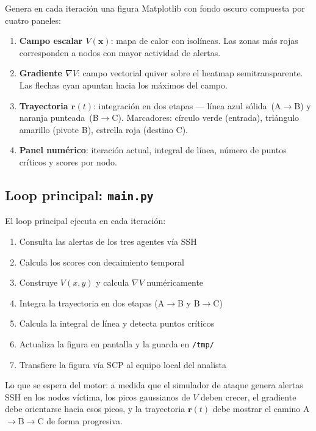 \documentclass[12pt,a4paper]{article}
\newcommand{\grad}{\nabla}
\begin{document}
Genera en cada iteración una figura Matplotlib con fondo oscuro
compuesta por cuatro paneles:

\begin{enumerate}
  \item \textbf{Campo escalar $V(\mathbf{x})$}: mapa de calor con
    isolíneas. Las zonas más rojas corresponden a nodos con mayor
    actividad de alertas.
  \item \textbf{Gradiente $\grad V$}: campo vectorial quiver sobre
    el heatmap semitransparente. Las flechas cyan apuntan hacia los
    máximos del campo.
  \item \textbf{Trayectoria $\mathbf{r}(t)$}: integración en dos
    etapas — línea azul sólida~(A$\to$B) y naranja punteada~(B$\to$C).
    Marcadores: círculo verde (entrada), triángulo amarillo (pivote B),
    estrella roja (destino C).
  \item \textbf{Panel numérico}: iteración actual, integral de línea,
    número de puntos críticos y scores por nodo.
\end{enumerate}

\subsection{Loop principal: \texttt{main.py}}

El loop principal ejecuta en cada iteración:

\begin{enumerate}
  \item Consulta las alertas de los tres agentes vía SSH
  \item Calcula los scores con decaimiento temporal
  \item Construye $V(x,y)$ y calcula $\grad V$ numéricamente
  \item Integra la trayectoria en dos etapas (A$\to$B y B$\to$C)
  \item Calcula la integral de línea y detecta puntos críticos
  \item Actualiza la figura en pantalla y la guarda en \texttt{/tmp/}
  \item Transfiere la figura vía SCP al equipo local del analista
\end{enumerate}

Lo que se espera del motor: a medida que el simulador de ataque genera
alertas SSH en los nodos víctima, los picos gaussianos de $V$ deben
crecer, el gradiente debe orientarse hacia esos picos, y la trayectoria
$\mathbf{r}(t)$ debe mostrar el camino A$\to$B$\to$C de forma progresiva.
\end{document}
